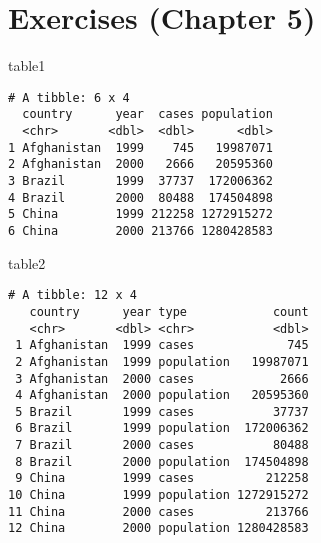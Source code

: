 \documentclass[
  letterpaper,
  DIV=11,
  numbers=noendperiod]{scrreprt}
\newenvironment{Shaded}{\begin{snugshade}}{\end{snugshade}}
\newcommand{\NormalTok}[1]{\textcolor[rgb]{0.00,0.23,0.31}{#1}}
\begin{document}

\hypertarget{exercises-chapter-5}{%
\chapter{Exercises (Chapter 5)}\label{exercises-chapter-5}}

\begin{tcolorbox}[enhanced jigsaw, left=2mm, rightrule=.15mm, bottomtitle=1mm, opacitybacktitle=0.6, leftrule=.75mm, opacityback=0, colframe=quarto-callout-tip-color-frame, bottomrule=.15mm, coltitle=black, toptitle=1mm, colback=white, titlerule=0mm, colbacktitle=quarto-callout-tip-color!10!white, title={Tables}, toprule=.15mm, breakable, arc=.35mm]

\begin{Shaded}
\begin{Highlighting}[]
\NormalTok{table1}
\end{Highlighting}
\end{Shaded}

\begin{verbatim}
# A tibble: 6 x 4
  country      year  cases population
  <chr>       <dbl>  <dbl>      <dbl>
1 Afghanistan  1999    745   19987071
2 Afghanistan  2000   2666   20595360
3 Brazil       1999  37737  172006362
4 Brazil       2000  80488  174504898
5 China        1999 212258 1272915272
6 China        2000 213766 1280428583
\end{verbatim}

\begin{Shaded}
\begin{Highlighting}[]
\NormalTok{table2}
\end{Highlighting}
\end{Shaded}

\begin{verbatim}
# A tibble: 12 x 4
   country      year type            count
   <chr>       <dbl> <chr>           <dbl>
 1 Afghanistan  1999 cases             745
 2 Afghanistan  1999 population   19987071
 3 Afghanistan  2000 cases            2666
 4 Afghanistan  2000 population   20595360
 5 Brazil       1999 cases           37737
 6 Brazil       1999 population  172006362
 7 Brazil       2000 cases           80488
 8 Brazil       2000 population  174504898
 9 China        1999 cases          212258
10 China        1999 population 1272915272
11 China        2000 cases          213766
12 China        2000 population 1280428583
\end{verbatim}


\end{tcolorbox}
\end{document}
